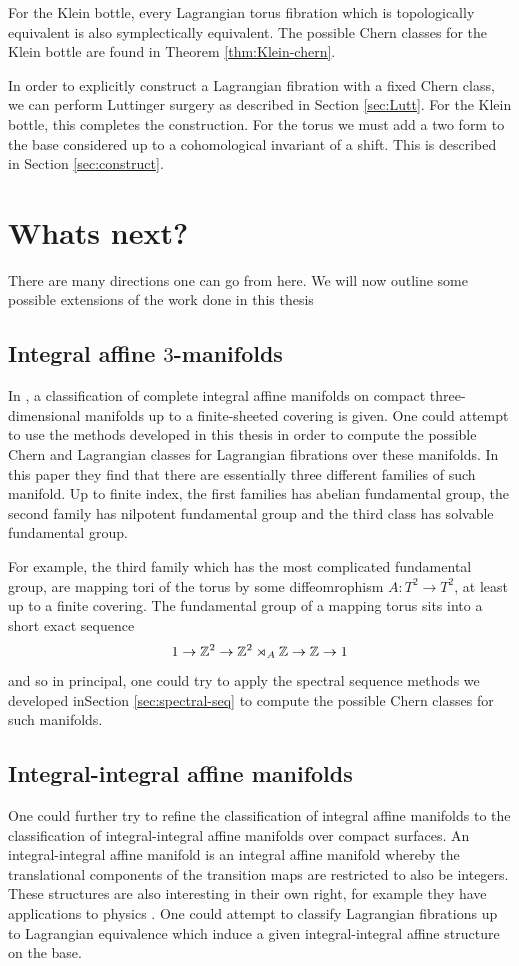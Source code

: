 For the Klein bottle, every Lagrangian torus fibration which is topologically
equivalent is also symplectically equivalent. The possible Chern classes for
the Klein bottle are found in Theorem \ref{thm:Klein-chern}.

\kleinChern*

In order to explicitly construct a Lagrangian fibration with a fixed Chern
class, we can perform Luttinger surgery as described in Section \ref{sec:Lutt}.
For the Klein bottle, this completes the construction. For the torus we must
add a two form to the base considered up to a cohomological invariant of a
shift. This is described in Section \ref{sec:construct}.

\section*{Whats next?}

There are many directions one can go from here. We will now outline some
possible extensions of the work done in this thesis

\subsection*{Integral affine $3$-manifolds}
In \cite{kozlov2018integralaffine3manifolds}, a classification of complete
integral affine manifolds on compact three-dimensional manifolds up to a
finite-sheeted covering is given. One could attempt to use the methods
developed in this thesis in order to compute the possible Chern and Lagrangian
classes for Lagrangian fibrations over these manifolds. In this paper they find
that there are essentially three different families of such manifold. Up to
finite index, the first families has abelian fundamental group, the second
family has nilpotent fundamental group and the third class has solvable
fundamental group.

For example, the third family which has the most complicated fundamental group,
are mapping tori of the torus by some diffeomrophism $A: T^2 \to T^2$, at least
up to a finite covering. The fundamental group of a mapping torus sits into a
short exact sequence $$ 1 \to \mathbb{Z}^2 \to \mathbb{Z}^2 \rtimes_{A} \mathbb{Z} \to \mathbb{Z} \to 1 $$ and
so in principal, one could try to apply the spectral sequence methods we
developed inSection \ref{sec:spectral-seq} to compute the possible Chern
classes for such manifolds.

\subsection*{Integral-integral affine manifolds}
One could further try to refine the classification of integral affine manifolds
to the classification of integral-integral affine manifolds over compact
surfaces. An integral-integral affine manifold is an integral affine manifold
whereby the translational components of the transition maps are restricted to
also be integers. These structures are also interesting in their own right, for
example they have applications to physics \cite{HAMILTON2026105745}. One could
attempt to classify Lagrangian fibrations up to Lagrangian equivalence which
induce a given integral-integral affine structure on the base.

